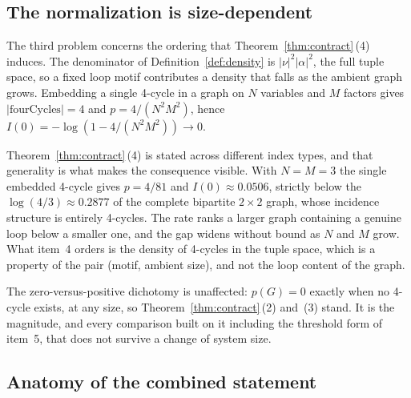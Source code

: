 \documentclass[aps,prx,reprint,nofootinbib,floatfix]{revtex4-2}
\begin{document}
\subsection{The normalization is size-dependent}
\label{sec:normalization}

The third problem concerns the ordering that Theorem~\ref{thm:contract}\,(4)
induces. The denominator of Definition~\ref{def:density} is
$|\nu|^2|\alpha|^2$, the full tuple space, so a fixed loop motif contributes a
density that falls as the ambient graph grows. Embedding a single 4-cycle in a
graph on $N$ variables and $M$ factors gives $|\mathrm{fourCycles}| = 4$ and
$p = 4/(N^2M^2)$, hence $I(0) = -\log(1 - 4/(N^2M^2)) \to 0$.

Theorem~\ref{thm:contract}\,(4) is stated across different index types, and
that generality is what makes the consequence visible. With $N = M = 3$ the
single embedded 4-cycle gives $p = 4/81$ and $I(0) \approx 0.0506$, strictly
below the $\log(4/3) \approx 0.2877$ of the complete bipartite $2 \times 2$
graph, whose incidence structure is entirely 4-cycles. The rate ranks a larger
graph containing a genuine loop below a smaller one, and the gap widens without
bound as $N$ and $M$ grow. What item~4 orders is the density of 4-cycles in the
tuple space, which is a property of the pair (motif, ambient size), and not the
loop content of the graph.

The zero-versus-positive dichotomy is unaffected: $p(G) = 0$ exactly when no
4-cycle exists, at any size, so Theorem~\ref{thm:contract}\,(2) and~(3) stand.
It is the magnitude, and every comparison built on it including the threshold
form of item~5, that does not survive a change of system size.

\subsection{Anatomy of the combined statement}
\label{sec:anatomy}
\end{document}
